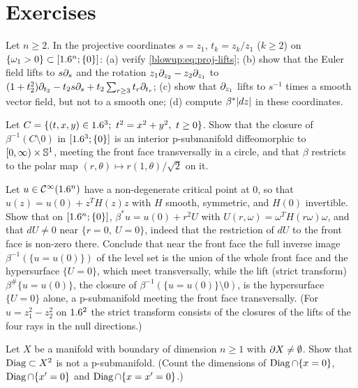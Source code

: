 \section{Exercises}\label{blowup:sec:exercises}

\begin{exercise}\label{blowup:ex:projective}
Let $n\ge2$. In the projective coordinates $s=z_1$, $t_k=z_k/z_1$ ($k\ge2$) on
$\{\omega_1>0\}\subset[1.6^n;\{0\}]$: (a) verify \eqref{blowup:eq:proj-lifts}; (b) show that the
Euler field lifts to $s\partial_s$ and the rotation $z_1\partial_{z_2}-z_2\partial_{z_1}$ to
$(1+t_2^2)\partial_{t_2}-t_2s\partial_s+t_2\sum_{r\ge3}t_r\partial_{t_r}$; (c) show that $\partial_{z_1}$ lifts to
$s^{-1}$ times a smooth vector field, but not to a smooth one; (d) compute
$\beta^*\lvert dz\rvert$ in these coordinates.
\end{exercise}

\begin{exercise}\label{blowup:ex:cone}
Let $C=\{(t,x,y)\in1.6^3;\ t^2=x^2+y^2,\ t\ge0\}$. Show that the closure of
$\beta^{-1}(C\setminus0)$ in $[1.6^3;\{0\}]$ is an interior p-submanifold diffeomorphic to
$[0,\infty)\times\mathbb{S}^1$, meeting the front face transversally in a circle, and that
$\beta$ restricts to the polar map $(r,\theta)\mapsto r(1,\theta)/\sqrt2$ on it.
\end{exercise}

\begin{exercise}\label{blowup:ex:morse}
Let $u\in\mathcal{C}^\infty(1.6^n)$ have a non-degenerate critical point at $0$, so that
$u(z)=u(0)+z^TH(z)z$ with $H$ smooth, symmetric, and $H(0)$ invertible. Show that on
$[1.6^n;\{0\}]$, $\beta^*u=u(0)+r^2U$ with $U(r,\omega)=\omega^TH(r\omega)\omega$, and that
$dU\ne0$ near $\{r=0,\ U=0\}$, indeed that the restriction of $dU$ to the front face is non-zero
there. Conclude that near the front face the full inverse image $\beta^{-1}(\{u=u(0)\})$ of the
level set is the union of the whole front face and the hypersurface $\{U=0\}$, which meet
transversally, while the lift (strict transform) $\beta^\#\{u=u(0)\}$, the closure of
$\beta^{-1}(\{u=u(0)\}\setminus0)$, is the hypersurface $\{U=0\}$ alone, a p-submanifold
meeting the front face transversally. \textup{(}For $u=z_1^2-z_2^2$ on $1.6^2$ the strict
transform consists of the closures of the lifts of the four rays in the null directions.\textup{)}
\end{exercise}

\begin{exercise}\label{blowup:ex:diag-not-p}
Let $X$ be a manifold with boundary of dimension $n\ge1$ with $\partial X\ne\emptyset$. Show that
$\operatorname{Diag}\subset X^2$ is not a p-submanifold. (Count the dimensions of $\operatorname{Diag}\cap\{x=0\}$,
$\operatorname{Diag}\cap\{x'=0\}$ and $\operatorname{Diag}\cap\{x=x'=0\}$.)
\end{exercise}

